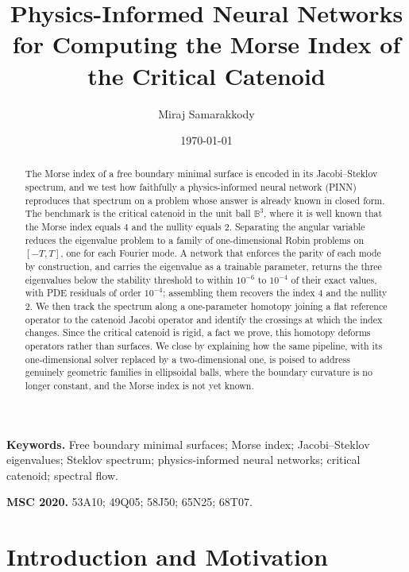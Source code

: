 \documentclass[11pt]{article}
\author{Miraj Samarakkody}
\title{Physics-Informed Neural Networks for Computing the Morse Index of the Critical Catenoid}
\date{\today}
\theoremstyle{definition}
\theoremstyle{plain}
\begin{document}
\maketitle

\begin{abstract}
	The Morse index of a free boundary minimal surface is encoded in its Jacobi--Steklov spectrum, and we test how faithfully a physics-informed neural network (PINN) reproduces that spectrum on a problem whose answer is already known in closed form. The benchmark is the critical catenoid in the unit ball $\mathbb{B}^3$, where it is well known that the Morse index equals $4$ and the nullity equals $2$. Separating the angular variable reduces the eigenvalue problem to a family of one-dimensional Robin problems on $[-T,T]$, one for each Fourier mode. A network that enforces the parity of each mode by construction, and carries the eigenvalue as a trainable parameter, returns the three eigenvalues below the stability threshold to within $10^{-6}$ to $10^{-4}$ of their exact values, with PDE residuals of order $10^{-4}$; assembling them recovers the index $4$ and the nullity $2$. We then track the spectrum along a one-parameter homotopy joining a flat reference operator to the catenoid Jacobi operator and identify the crossings at which the index changes. Since the critical catenoid is rigid, a fact we prove, this homotopy deforms operators rather than surfaces. We close by explaining how the same pipeline, with its one-dimensional solver replaced by a two-dimensional one, is poised to address genuinely geometric families in ellipsoidal balls, where the boundary curvature is no longer constant, and the Morse index is not yet known.
\end{abstract}

\medskip
\noindent\textbf{Keywords.} Free boundary minimal surfaces; Morse index; Jacobi--Steklov eigenvalues; Steklov spectrum; physics-informed neural networks; critical catenoid; spectral flow.

\smallskip
\noindent\textbf{MSC 2020.} 53A10; 49Q05; 58J50; 65N25; 68T07.

\section{Introduction and Motivation}
\end{document}
